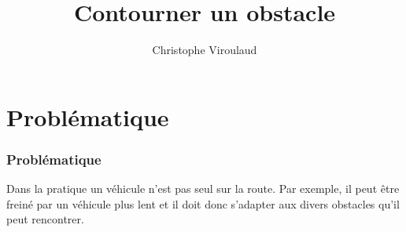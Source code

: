 \documentclass[svgnames,11pt]{beamer}
\author[]{Christophe Viroulaud}
\title{Contourner un obstacle}
\date{}
\institute{Seconde - SNT}
\begin{document}
\begin{frame}
\titlepage
\end{frame}

\section{Problématique}
\begin{frame}
    \frametitle{Problématique}

    Dans la pratique un véhicule n'est pas seul sur la route. Par exemple, il peut être freiné par un véhicule plus lent et il doit donc s'adapter aux divers obstacles qu'il peut rencontrer. 
\begin{center}
\end{center}

\end{frame}
\end{document}
